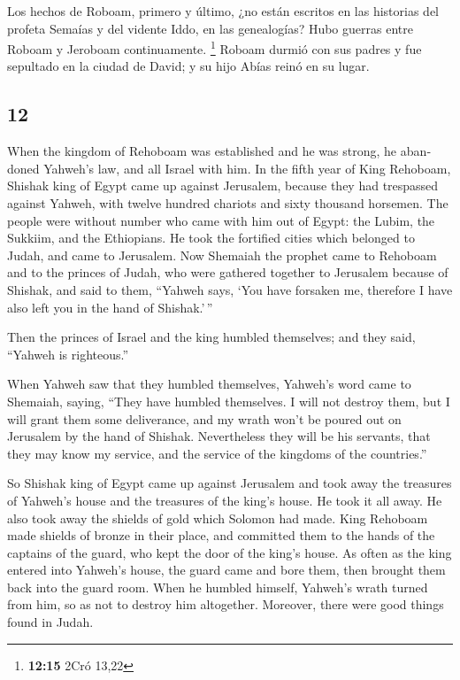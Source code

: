 \begin{paracol}{2}
 Los hechos de Roboam, primero y último, ¿no están
escritos en las historias del profeta Semaías y del vidente Iddo, en las
genealogías? Hubo guerras entre Roboam y Jeroboam continuamente.
\footnote{\textbf{12:15} 2Cró 13,22}  Roboam durmió con
sus padres y fue sepultado en la ciudad de David; y su hijo Abías reinó
en su lugar.

\switchcolumn
\begin{otherlanguage}{english}

\hypertarget{section-23}{%
\section{12}\label{section-23}}

 When the kingdom of Rehoboam was established and he was
strong, he abandoned Yahweh's law, and all Israel with him.
 In the fifth year of King Rehoboam, Shishak king of Egypt
came up against Jerusalem, because they had trespassed against Yahweh,
 with twelve hundred chariots and sixty thousand horsemen.
The people were without number who came with him out of Egypt: the
Lubim, the Sukkiim, and the Ethiopians.  He took the
fortified cities which belonged to Judah, and came to Jerusalem.
 Now Shemaiah the prophet came to Rehoboam and to the
princes of Judah, who were gathered together to Jerusalem because of
Shishak, and said to them, ``Yahweh says, `You have forsaken me,
therefore I have also left you in the hand of Shishak.'\,''

 Then the princes of Israel and the king humbled
themselves; and they said, ``Yahweh is righteous.''

 When Yahweh saw that they humbled themselves, Yahweh's
word came to Shemaiah, saying, ``They have humbled themselves. I will
not destroy them, but I will grant them some deliverance, and my wrath
won't be poured out on Jerusalem by the hand of Shishak. 
Nevertheless they will be his servants, that they may know my service,
and the service of the kingdoms of the countries.''

 So Shishak king of Egypt came up against Jerusalem and
took away the treasures of Yahweh's house and the treasures of the
king's house. He took it all away. He also took away the shields of gold
which Solomon had made.  King Rehoboam made shields of
bronze in their place, and committed them to the hands of the captains
of the guard, who kept the door of the king's house.  As
often as the king entered into Yahweh's house, the guard came and bore
them, then brought them back into the guard room.  When
he humbled himself, Yahweh's wrath turned from him, so as not to destroy
him altogether. Moreover, there were good things found in Judah.


\end{otherlanguage}
\end{paracol}
